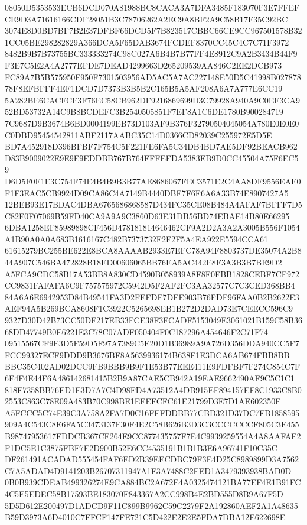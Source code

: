 \documentclass[UTF8,fontset=fandol,zihao=-4,a4paper]{ctexart}
\begin{document}
{{08050D5353533ECB6DCD070A81988BC8CACA3A7DFA3485F183070F3E7FFEFCE9D3A71616166CDF28051B3C78706262A2EC9A8BF2A9C58B17F35C92BC
3074E8D0BD7BF7B2E37DFBF66DCD5F7B823517CBBC66CE9CC967501578B321CC05BE298282829A366DCA5F65DAB3674FCDEF8370CC45C4C7C71F3972
8482B9B7B73755BC333333274C98C027A6B4B7B77FF4E8912C9A2B3434B44F9F3E7C5E2A4A2777EFDE7DEAD4299663D265209539AA846C2EE2DCB973
FC89A7B5B575950F950F7301503956AD5AC5A7AC227148E50D5C41998B02787878F8EFBFFF4EF1DCD7D7373B3B5B2C165B5A5AF208A6A7A777E6CC19
5A282BE6CACFCF3F76EC58CB962DF9216869699D3C79928A940A9C0EF3CA952BD53732A14C9B8BCDEFC3B2540505851F7EF8A1C6DE1780B900284719
7C9687D9B3674B6BD0004199EB73D103AF9B376F32790504045054A780E0E0E0C0DBD95454542811ABF2117AABC35C14D0366CD82039C255972E5D5E
BD7A452918D396BFBF7F754C5F221FE6FA5C34DB4BD7AE5DF92BEACB962D83B9009022E9E9E9EDDBB767B764FFFEFDA5383EB9D0CC45504A75F6EC59
D6D5F0F1E3C754F74E4B4B9B3B77AE8686067FEC3571E2C4AA8DF9556EAE0F1F3EAC5CB9924D09CA86C4A7149B4440DBF7F6F6A6A33B74E8907427A5
12BEB93E17BDAC4DBA6765686868587D434FC35CE08B484A4AFAF7BFFF7D5C82F0F07069B59FD40CA9A9A9C3860D63E31DB56BD74EBAE14B80E66295
6DBA1258EF85989898CF456D478181814646462CF9A2D2A3A2A3005B556F1054A1B90A0A0A683B1616167C482B7373732F2F2F5A4EA922E5594CCA61
61615279BC255BE622E8BCA8AAAAB2933E7EFC78A94F8803737DE35074A2B844A907C546BA472828B18ED00606065BB76EA5AC442E8F3A3B3B7BE9D2
A5FCA9CDC58B17A53BB8A830CD4590B058939A8F8F0FBB1828CEBF7CF972CC9831FAFAFA6C9F757575972C5942D5F2AF2FC3AA32577C7C3CED368BB4
84A6A6E6942953D84B49541FA3D2FEFDF7DFE903B76FDF96FAA0B2B2622E3AEF94A5B269BCA8608F1C3922C5265698EB1B272D2DAD73E7CEECC596C9
9327D30D42B73CC50DF217EB33FCE38F3FCADF5153049E3061021B159C58B3668DD47749B0E6221E3C78C07ADF050404F0C187296A454646F2C71F74
09515567CF9E3D5F59D5F97A7389C5E20D1B36989A9A726D356DDA940CC5F7FCC99327ECF9DDD9B3676BF8A5639936174B638F1E3DCA6AB674FBB8BB
BBC35C402AD02DCC9FB9BBB9B9F1E53B77EEE411E9FDFBF7F274C854C7F6F4F4E44F6A486142681415B2B9A87CAE5CB942A19EAE9662490AF9C5C1C1
818F7358BB76ED1E3D7A7C4D98FD4A73512A4DB915EF894157EF8C1933C8B02553C863C78E09A483B70C998BE1EFEFCFC61E21799D3E7D1AE602350F
A5FCCC5C74E39C3A758A2FA7D0C16FFFDDBB77CBD321D37DC7FB1858595909A4C543C8E6FA5C3473137F30F4E2C58B626B3D3C3CCCCCCCF805C3E455
B98747953617FDDCB367CF264E9CC877435757F7E4C9939259554A4A8AAFAF2F1DC5E1C3875FBF7E2D900B52E6CC4535191B1B1B3E6A96741F10C35C
DF261491ACADAD555454FAF6ED2B39EECDBC79F3E4D25C8989899D3A7562C7A5ADAD4D9141203B26707311947A1F3A7488C2FED1A3479393938BAD0D
0B0B939CDEAB499326274E9CA884BC2A672E4A0325474121BA77EF4E1B91FC4C5E5EDEC58B17593BE183070F843367A2CC998B4E2BD555D8B9A67F5D
5D5D612E200497D1ADCD9F11C899B9962C59C2279F2A192860AEF2A1A48635B59D3973A6D4010C7FFCF147FE721C5D422E2E2E5FDA7DBA12E622698E
}}
\end{document}
